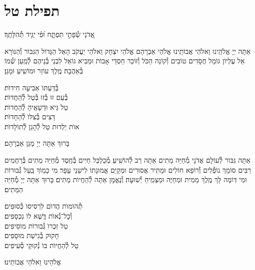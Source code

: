 \documentclass[twoside, openany, parskip=half, 11pt]{book}
\begin{document}
\sepline

\clearpage

\vspace{-1\baselineskip}

\section[תפילת טל]{ תפילת טל }
\label{tefilastal}


\begin{small}
אֲ֭דֹנָי שְׂ֯פָתַ֣י תִּפְתָּ֑ח וּ֝פִ֗י יַגִּ֥יד תְּ֯הִלָּתֶֽךָ׃
\\
\end{small}
אַתָּה יְיָ אֱלֹהֵֽינוּ וֵאלֹהֵי אֲבוֹתֵֽינוּ אֱלֹהֵי אַבְרָהָם אֱלֹהֵי יִצְחָק וֵאלֹהֵי יַעֲקֹב הָאֵל הַגָּדוֹל הַגִּבּוֹר וְ֯הַנּוֹרָא אֵל עֶלְיוֹן גּוֹמֵל חֲסָדִים טוֹבִים וְ֯קוֹנֵה הַכֹּל וְ֯זוֹכֵר חַסְדֵי אָבוֹת וּמֵבִיא גוֹאֵל לִבְנֵי בְ֯נֵיהֶם לְ֯מַֽעַן שְׁ֯מוֹ בְּ֯אַהֲבָה׃ מֶֽלֶךְ עוֹזֵר וּמוֹשִֽׁיעַ וּמָגֵן׃


\begin{large}
בְּ֯דַעְתּוׂ אַבִּיעָה חִידוׂת׃ \\
בְּ֯עַם זוּ בְּ֯זוּ בְּ֯טַל לְ֯הַחֲדוׂת׃\\
טַל גֵּיא וּדְשָׁאֶֽיהָ לְ֯הַחֲדוׂת׃ \\
דָּצִים בְּ֯צִלּוׂ לְ֯הֵחָדוׂת׃\\
אוׂת יַלְדוּת טַל לְ֯הָגֵן לְ֯תוׂלָדוׂת׃

\end{large}


בָּרוּךְ אַתָּה יְיָ מָגֵן אַבְרָהָם׃

אַתָּה גִּבּוֹר לְ֯עוֹלָם אֲדֹנָי מְ֯חַיֵּה מֵתִים אַתָּה רַב לְ֯הוֹשִֽׁיעַ׃ מְ֯כַלְכֵּל חַיִּים בְּ֯חֶֽסֶד מְ֯חַיֵּה מֵתִים בְּ֯רַחֲמִים רַבִּים סוֹמֵךְ נוֹפְ֯לִים וְ֯רוֹפֵא חוֹלִים וּמַתִּיר אֲסוּרִים וּמְקַיֵּם אֱמוּנָתוֹ לִישֵׁנֵי עָפָר׃ מִי כָמֽוֹךָ בַּֽעַל גְּ֯בוּרוֹת וּמִי דּֽוֹמֶה לָּךְ מֶֽלֶךְ מֵמִית וּמְחַיֶּה וּמַצְמִֽיחַ יְ֯שׁוּעָה׃ וְ֯נֶאֱמָן אַתָּה לְ֯הַחֲיוֹת מֵתִים׃ בָּרוּךְ אַתָּה יְיָ מְ֯חַיֵּה הַמֵּתִים׃


תְּ֯הוׂמוׂת הֲדוׂם לִרְסִיסוׂ כְּ֯סוּפִים׃ \\
וְ֯כׇל־נְ֯אוׂת דֶּֽשֶׁא לוׂ נִכְסָפִים׃\\
טַל זִכְרוׂ גְּ֯בוּרוׂת מוׂסִיפִים׃ \\
חָקוּק בְּ֯גִישַׁת מוּסָפִים׃\\
טַל לְ֯הַחֲיוׂת בּוׂ נְ֯קוּקֵי סְ֯עִיפִים׃


\begin{small}
אֱלֹהֵינוּ וֵאלֹהֵי אֲבוֹתֵינוּ׃
\end{small}
\end{document}
